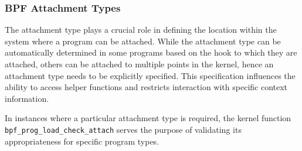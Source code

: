 \subsubsection{BPF Attachment Types}

The attachment type plays a crucial role in defining the location within the system where a program can be attached. 
While the attachment type can be automatically determined in some programs based on the hook to which they are attached, others can be attached to multiple points in the kernel, hence an attachment type needs to be explicitly specified. This specification influences the ability to access helper functions and restricts interaction with specific context information.

In instances where a particular attachment type is required, the kernel function \texttt{bpf\_prog\_load\_check\_attach} serves the purpose of validating its appropriateness for specific program types.

